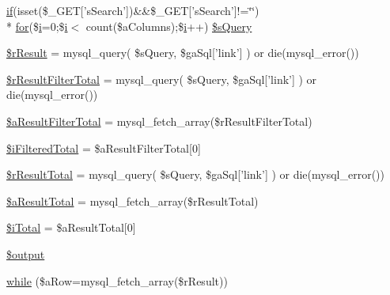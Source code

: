 \begin{DoxyCompactItemize}
\hyperlink{fullpage_2plugin_8js_a8b98017e64ef036adb9ae327ff94abe1}{if}(isset(\$\+\_\+\+G\+E\+T\mbox{[}'s\+Search'\mbox{]})\&\&\$\+\_\+\+G\+E\+T\mbox{[}'s\+Search'\mbox{]}!=\char`\"{}\char`\"{}) \\*
\hyperlink{tinymce_8jquery_8dev_8js_a4675a875b20881bc5f7011f49fbd4da7}{for}(\$\hyperlink{validate_8js_a5e25b1d1bed9ab5f3174b76d6a722180}{i}=0;\$\hyperlink{validate_8js_a5e25b1d1bed9ab5f3174b76d6a722180}{i}$<$ count(\$a\+Columns);\$\hyperlink{validate_8js_a5e25b1d1bed9ab5f3174b76d6a722180}{i}++) \hyperlink{extras_2_scroller_2media_2data_2server__processing_8php_a5175d5486118502db3f7aa1ccf7029cc}{\$s\+Query}
\item 
\hyperlink{extras_2_scroller_2media_2data_2server__processing_8php_a8f423fcb1764890d70da997a4140f703}{\$r\+Result} = mysql\+\_\+query( \$s\+Query, \$ga\+Sql\mbox{[}'link'\mbox{]} ) or die(mysql\+\_\+error())
\item 
\hyperlink{extras_2_scroller_2media_2data_2server__processing_8php_a29b3b8a9782e4c5b8157be2ba70a33e1}{\$r\+Result\+Filter\+Total} = mysql\+\_\+query( \$s\+Query, \$ga\+Sql\mbox{[}'link'\mbox{]} ) or die(mysql\+\_\+error())
\item 
\hyperlink{extras_2_scroller_2media_2data_2server__processing_8php_a56c6da767ba5c9ca3c5f0c103dfaa77d}{\$a\+Result\+Filter\+Total} = mysql\+\_\+fetch\+\_\+array(\$r\+Result\+Filter\+Total)
\item 
\hyperlink{extras_2_scroller_2media_2data_2server__processing_8php_a48dbbdca4a5a8b8d03ef6c76dd65a5c1}{\$i\+Filtered\+Total} = \$a\+Result\+Filter\+Total\mbox{[}0\mbox{]}
\item 
\hyperlink{extras_2_scroller_2media_2data_2server__processing_8php_a48722b6bbefe9d4cb748bf0c3f936272}{\$r\+Result\+Total} = mysql\+\_\+query( \$s\+Query, \$ga\+Sql\mbox{[}'link'\mbox{]} ) or die(mysql\+\_\+error())
\item 
\hyperlink{extras_2_scroller_2media_2data_2server__processing_8php_ab01fea9c7d5ce59f138eabb6206fe6b8}{\$a\+Result\+Total} = mysql\+\_\+fetch\+\_\+array(\$r\+Result\+Total)
\item 
\hyperlink{extras_2_scroller_2media_2data_2server__processing_8php_a7ba288b7060e9fe77272bafe66c2403d}{\$i\+Total} = \$a\+Result\+Total\mbox{[}0\mbox{]}
\item 
\hyperlink{extras_2_scroller_2media_2data_2server__processing_8php_a73004ce9cd673c1bfafd1dc351134797}{\$output}
\item 
\hyperlink{extras_2_scroller_2media_2data_2server__processing_8php_a83084cf6f83823d8593882985353708d}{while} (\$a\+Row=mysql\+\_\+fetch\+\_\+array(\$r\+Result))
\end{DoxyCompactItemize}


